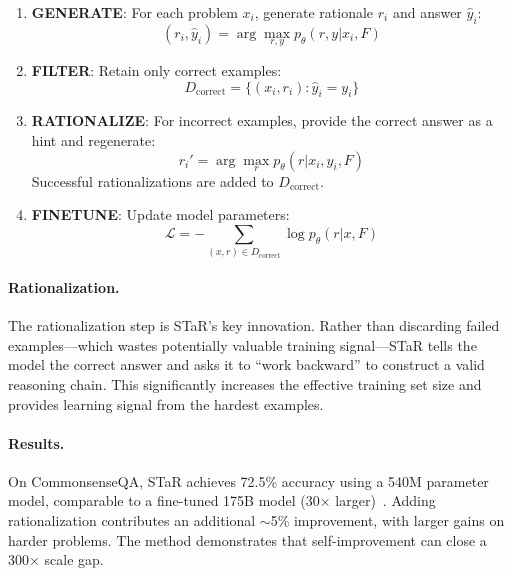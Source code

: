 \begin{enumerate}
    \item \textbf{GENERATE}: For each problem $x_i$, generate rationale $r_i$ and answer $\hat{y}_i$:
    \begin{equation}
        (r_i, \hat{y}_i) = \arg\max_{r,y} p_\theta(r, y | x_i, F)
    \end{equation}
    \item \textbf{FILTER}: Retain only correct examples:
    \begin{equation}
        D_{\text{correct}} = \{(x_i, r_i) : \hat{y}_i = y_i\}
    \end{equation}
    \item \textbf{RATIONALIZE}: For incorrect examples, provide the correct answer as a hint and regenerate:
    \begin{equation}
        r_i' = \arg\max_r p_\theta(r | x_i, y_i, F)
    \end{equation}
    Successful rationalizations are added to $D_{\text{correct}}$.
    \item \textbf{FINETUNE}: Update model parameters:
    \begin{equation}
        \mathcal{L} = -\sum_{(x,r) \in D_{\text{correct}}} \log p_\theta(r | x, F)
    \end{equation}
\end{enumerate}

\paragraph{Rationalization.}
The rationalization step is STaR's key innovation. Rather than discarding failed examples---which wastes potentially valuable training signal---STaR tells the model the correct answer and asks it to ``work backward'' to construct a valid reasoning chain. This significantly increases the effective training set size and provides learning signal from the hardest examples.

\paragraph{Results.}
On CommonsenseQA, STaR achieves 72.5\% accuracy using a 540M parameter model, comparable to a fine-tuned 175B model (30$\times$ larger)~\citep{zelikman2022star}. Adding rationalization contributes an additional $\sim$5\% improvement, with larger gains on harder problems. The method demonstrates that self-improvement can close a 300$\times$ scale gap.

